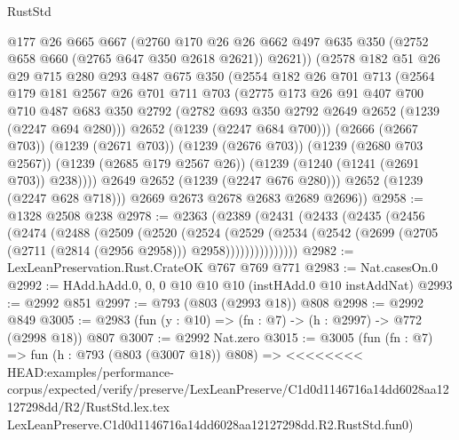 \begin{lexlean}{RustStd}
\begin{coremodule}
{\begin{coremodule}
{{{{{{{            @177
            @26
            @665
            @667
            (@2760
              @170
              @26
              @26
              @662
              @497
              @635
              @350
              (@2752 @658 @660 (@2765 @647 @350 @2618 @2621))
              @2621))
          (@2578
            @182
            @51
            @26
            @29
            @715
            @280
            @293
            @487
            @675
            @350
            (@2554
              @182
              @26
              @701
              @713
              (@2564
                @179
                @181
                @2567
                @26
                @701
                @711
                @703
                (@2775
                  @173
                  @26
                  @91
                  @407
                  @700
                  @710
                  @487
                  @683
                  @350
                  @2792
                  (@2782 @693 @350 @2792 @2649 @2652 (@1239 (@2247 @694 @280)))
                  @2652
                  (@1239 (@2247 @684 @700)))
                (@2666 (@2667 @703))
                (@1239 (@2671 @703))
                (@1239 (@2676 @703))
                (@1239 (@2680 @703 @2567))
                (@1239 (@2685 @179 @2567 @26))
                (@1239 (@1240 (@1241 (@2691 @703)) @238))))
            @2649
            @2652
            (@1239 (@2247 @676 @280)))
          @2652
          (@1239 (@2247 @628 @718)))
        @2669
        @2673
        @2678
        @2683
        @2689
        @2696))
@2958 := @1328 @2508 @238
@2978 := @2363
    (@2389
      (@2431
        (@2433
          (@2435
            (@2456
              (@2474
                (@2488
                  (@2509
                    (@2520
                      (@2524
                        (@2529
                          (@2534
                            (@2542 (@2699 (@2705 (@2711 (@2814 (@2956 @2958))) @2958)))))))))))))))
@2982 := LexLeanPreservation.Rust.CrateOK @767 @769 @771
@2983 := Nat.casesOn.{0}
@2992 := HAdd.hAdd.{0, 0, 0} @10 @10 @10 (instHAdd.{0} @10 instAddNat)
@2993 := @2992 @851
@2997 := @793 (@803 (@2993 @18)) @808
@2998 := @2992 @849
@3005 := @2983 (fun (y : @10) => (fn : @7) -> (h : @2997) -> @772 (@2998 @18)) @807
@3007 := @2992 Nat.zero
@3015 := @3005
    (fun (fn : @7) =>
    fun (h : @793 (@803 (@3007 @18)) @808) =>
<<<<<<<< HEAD:examples/performance-corpus/expected/verify/preserve/LexLeanPreserve/C1d0d1146716a14dd6028aa12127298dd/R2/RustStd.lex.tex
    LexLeanPreserve.C1d0d1146716a14dd6028aa12127298dd.R2.RustStd.fun0)
}}}}}}}
\end{coremodule}}
\end{coremodule}
\end{lexlean}
